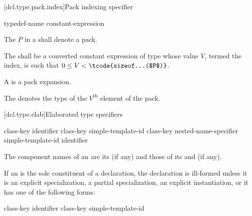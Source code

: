 [dcl.type.pack.index]{Pack indexing specifier}

\begin{bnf}
\br
    typedef-name  \terminal{[} constant-expression \terminal{]}
\end{bnf}

\pnum
The  $P$ in a 
shall denote a pack.

\pnum
The  shall be
a converted constant expression of type 
whose value $V$, termed the index,
is such that $0 \le V < \tcode{sizeof...($P$)}$.

\pnum
A  is a pack expansion.

\pnum
\begin{note}
The  denotes
the type of the $V^\text{th}$ element of the pack.
\end{note}

[dcl.type.elab]{Elaborated type specifiers}%
%
%

\begin{bnf}
\br
    class-key   identifier\br
    class-key simple-template-id\br
    class-key nested-name-specifier  simple-template-id\br
      identifier
\end{bnf}

\pnum
{}%
The component names of an  are
its  (if any) and
those of its  and
 (if any).

\pnum
{}%
%
If an  is the sole constituent of a
declaration, the declaration is ill-formed unless it is an explicit
specialization,
a partial specialization,
an explicit
instantiation, or it has one of the following
forms:

\begin{ncsimplebnf}
class-key  identifier \terminal{;}\br
class-key  simple-template-id \terminal{;}
\end{ncsimplebnf}

